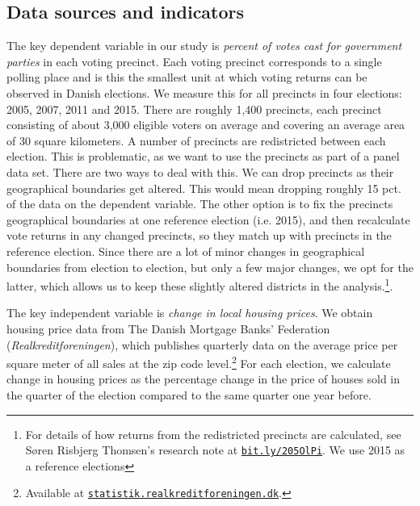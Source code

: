 \documentclass[12pt,a4paper]{article}
\begin{document}
\subsection{Data sources and indicators}
The key dependent variable in our study is \textit{percent of votes cast for government parties} in each voting precinct. Each voting precinct corresponds to a single polling place and is this the smallest unit at which voting returns can be observed in Danish elections. We measure this for all precincts in four elections:  2005, 2007, 2011 and 2015. There are roughly 1,400 precincts, each precinct consisting of about 3,000 eligible voters on average and covering an average area of 30 square kilometers. A number of precincts are redistricted between each election. This is problematic, as we want to use  the precincts as part of a panel data set. There are two ways to deal with this. We can drop precincts as their geographical boundaries get altered. This would mean dropping roughly 15 pct. of the data on the dependent variable. The other option is to fix the precincts geographical boundaries at one reference election (i.e. 2015), and then recalculate vote returns in any changed precincts, so they match up with precincts in the reference election. Since there are a lot of minor changes in geographical boundaries from election to election, but only a few major changes, we opt for the latter, which allows us to keep these slightly altered districts in the analysis.\footnote{For details of how returns from the redistricted precincts are calculated, see Søren Risbjerg Thomsen's research note at \texttt{\href{http://bit.ly/205OlPi}{bit.ly/205OlPi}}.  We use 2015 as a reference elections}. 

The key independent variable is \textit{change in local housing prices}. We obtain housing price data from The Danish Mortgage Banks' Federation (\textit{Realkreditforeningen}), which publishes quarterly data on the average price per square meter of all sales at the zip code level.\footnote{Available at \texttt{\href{http://statistik.realkreditforeningen.dk/}{statistik.realkreditforeningen.dk}}.} For each election, we calculate change in housing prices as the percentage change in the price of houses sold in the quarter of the election compared to the same quarter one year before. 
\end{document}
